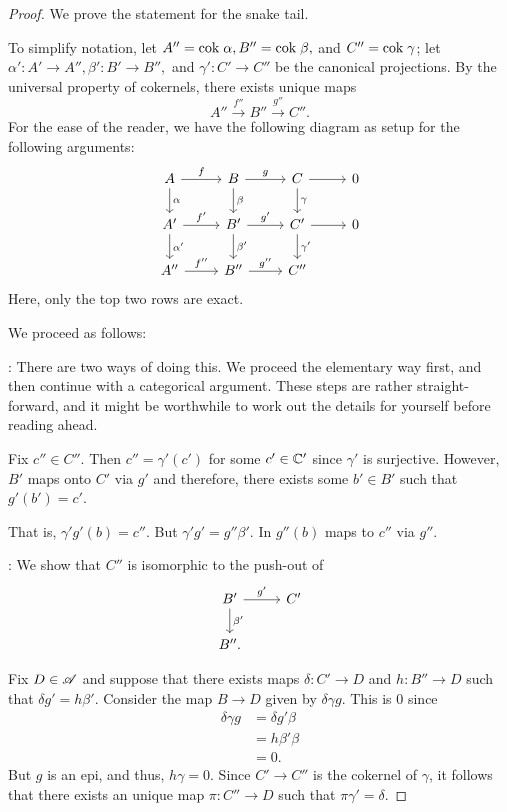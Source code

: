 \begin{proof}
We prove the statement for the snake tail.

To simplify notation, let $A'' = \mathrm{cok}\; \alpha, B'' = \mathrm{cok}\; \beta,$ 
and $C'' = \mathrm{cok}\; \gamma$; let $\alpha': A' \to A'', \beta': B' \to 
B'',$ and $\gamma': C' \to C''$ be the canonical projections. 
By the universal property of cokernels, there exists unique
maps
\[
A'' \stackrel{f''}{\to} B'' \stackrel{g''}{\to} C''.
\]
For the ease of the reader, we have the following diagram as setup
for the following arguments:
\[
\begin{tikzcd}
A \arrow{r}{f} \arrow{d}{\alpha} &
B \arrow{r}{g} \arrow{d}{\beta} &
C \arrow{r} \arrow{d}{\gamma} &
0 \\
A' \arrow{r}{f'} \arrow{d}{\alpha'} &
B' \arrow{r}{g'} \arrow{d}{\beta'} &
C' \arrow{r} \arrow{d}{\gamma'} &
0 \\
A'' \arrow{r}{f''} &
B'' \arrow{r}{g''} &
C''
\end{tikzcd}
\]
Here, only the top two rows are exact.

We proceed as follows:

: There are two ways of doing this.
We proceed the elementary way first, and then continue with
a categorical argument. These steps are rather straight-forward, 
and it might be worthwhile to work out the details for yourself 
before reading ahead.

Fix $c'' \in C''$. Then $c'' = \gamma'(c')$ for some $c' \in \mathbb{C}'$
since $\gamma'$ is surjective. However, $B'$ maps onto $C'$ via
$g'$ and therefore, there exists some $b' \in B'$ such that $g'(b')
= c'$.

That is, $\gamma'g'(b) = c''$. But $\gamma'g' = g''\beta'$. In
$g''(b)$ maps to $c''$ via $g''$.

 : We show that $C''$
is isomorphic to the push-out of
\[
\begin{tikzcd}
B' \arrow{r}{g'} \arrow{d}{\beta'} &C' \\
B''.
\end{tikzcd}
\]

Fix $D \in \mathscr{A}$ and suppose that there exists maps $\delta: 
C' \to D$ and $h: B'' \to D$ such that $\delta g' = h\beta'$.
Consider the map $B \to D$ given by $\delta \gamma g$. This is
$0$ since
\begin{align*}
\delta \gamma g &= \delta g' \beta \\
                &= h \beta' \beta \\
                &= 0.
\end{align*}
But $g$ is an epi, and thus, $h \gamma = 0$. Since $C' \to C''$
is the cokernel of $\gamma$, it follows that there exists an 
unique map $\pi: C'' \to D$ such that $\pi \gamma' = \delta.$


\end{proof}

